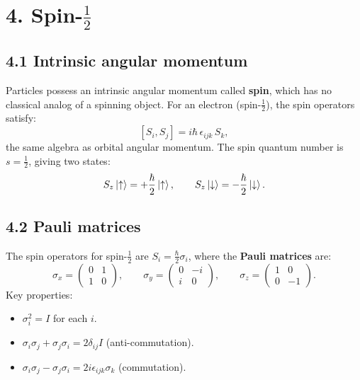 \documentclass[12pt,a4paper]{article}
\begin{document}
\section{4. Spin-$\frac{1}{2}$}

\subsection{4.1 Intrinsic angular momentum}

Particles possess an intrinsic angular momentum called \textbf{spin}, which has no classical analog of a spinning object.  For an electron (spin-$\frac{1}{2}$), the spin operators satisfy:
\[
    [S_i, S_j] = i\hbar\,\epsilon_{ijk}\,S_k,
\]
the same algebra as orbital angular momentum.  The spin quantum number is $s = \frac{1}{2}$, giving two states:
\[
    S_z\ket{\uparrow} = +\frac{\hbar}{2}\ket{\uparrow}, \qquad S_z\ket{\downarrow} = -\frac{\hbar}{2}\ket{\downarrow}.
\]

\subsection{4.2 Pauli matrices}

The spin operators for spin-$\frac{1}{2}$ are $S_i = \frac{\hbar}{2}\sigma_i$, where the \textbf{Pauli matrices} are:
\[
    \sigma_x = \begin{pmatrix} 0 & 1 \\ 1 & 0 \end{pmatrix}, \qquad
    \sigma_y = \begin{pmatrix} 0 & -i \\ i & 0 \end{pmatrix}, \qquad
    \sigma_z = \begin{pmatrix} 1 & 0 \\ 0 & -1 \end{pmatrix}.
\]
Key properties:
\begin{itemize}[nosep]
    \item $\sigma_i^2 = I$ for each $i$.
    \item $\sigma_i\sigma_j + \sigma_j\sigma_i = 2\delta_{ij}I$ (anti-commutation).
    \item $\sigma_i\sigma_j - \sigma_j\sigma_i = 2i\epsilon_{ijk}\sigma_k$ (commutation).
\end{itemize}

\end{document}
